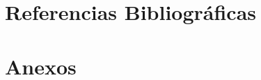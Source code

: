 \documentclass[12pt,a4paper]{article}
\begin{document}
\section{Referencias Bibliográficas}
\label{sec:referencias}
\printbibliography[heading=none]

\clearpage

\section{Anexos}
\label{sec:anexos}
\renewcommand{\thesubsection}{\Alph{subsection}}
\renewcommand{\thesubsubsection}{\thesubsection.\arabic{subsubsection}}

\clearpage

\clearpage

\end{document}
